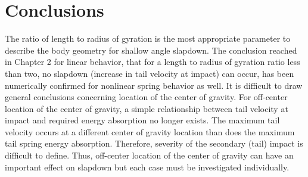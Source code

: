 \section{Conclusions}
The ratio of length to radius of gyration is the most appropriate
parameter to describe the body geometry for shallow angle
slapdown.  The conclusion reached in Chapter 2 for linear behavior,
that for a length to radius of gyration ratio less than two, no
slapdown (increase in tail velocity at impact) can occur, has been
numerically confirmed for nonlinear spring behavior as well.
It is difficult to draw general conclusions concerning location of the
center of gravity.  For
off-center location of the center of gravity, a simple relationship
between tail velocity at impact and required energy absorption no
longer exists.  The maximum tail velocity occurs at a different
center of gravity location than does the maximum tail spring energy
absorption.  Therefore, severity of the secondary (tail) impact is
difficult to define.  Thus, off-center location of the
center of gravity can have an important effect on slapdown but each
case must be investigated individually.
